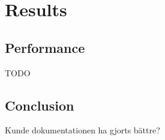 \section{Results}

\subsection{Performance}

TODO

\subsection{Conclusion}
Kunde dokumentationen ha gjorts bättre?

